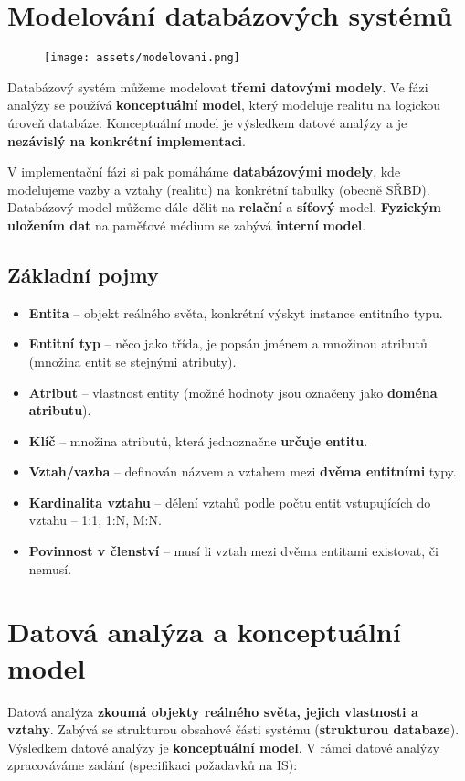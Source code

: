 \section{Modelování databázových systémů}
\begin{figure}[H]
    \centering
    \texttt{[image: assets/modelovani.png]}
\end{figure}

Databázový systém můžeme modelovat \textbf{třemi datovými modely}. Ve fázi analýzy se používá \textbf{konceptuální} \textbf{model}, který modeluje realitu na logickou úroveň databáze. Konceptuální model je výsledkem datové analýzy a je \textbf{nezávislý na konkrétní implementaci}.

V implementační fázi si pak pomáháme \textbf{databázovými} \textbf{modely}, kde modelujeme vazby a vztahy (realitu) na konkrétní tabulky (obecně SŘBD). Databázový model můžeme dále dělit na \textbf{relační} a \textbf{síťový} model. \textbf{Fyzickým uložením dat} na paměťové médium se zabývá \textbf{interní} \textbf{model}.

\subsection{Základní pojmy}
\begin{itemize}
    \item \textbf{Entita} -- objekt reálného světa, konkrétní výskyt instance entitního typu.
    \item \textbf{Entitní typ} -- něco jako třída, je popsán jménem a množinou atributů (množina entit se stejnými atributy).
    \item \textbf{Atribut} -- vlastnost entity (možné hodnoty jsou označeny jako \textbf{doména atributu}).
    \item \textbf{Klíč} -- množina atributů, která jednoznačne \textbf{určuje entitu}.
    \item \textbf{Vztah/vazba} -- definován názvem a vztahem mezi \textbf{dvěma entitními} typy.
    \item \textbf{Kardinalita vztahu} -- dělení vztahů podle počtu entit vstupujících do vztahu -- 1:1, 1:N, M:N.
    \item \textbf{Povinnost v členství} -- musí li vztah mezi dvěma entitami existovat, či nemusí.
\end{itemize}

\section{Datová analýza a konceptuální model}
Datová analýza \textbf{zkoumá objekty reálného světa, jejich vlastnosti a vztahy}. Zabývá se strukturou obsahové části systému (\textbf{strukturou databaze}). Výsledkem datové analýzy je \textbf{konceptuální model}. V rámci datové analýzy zpracováváme zadání (specifikaci požadavků na IS):

